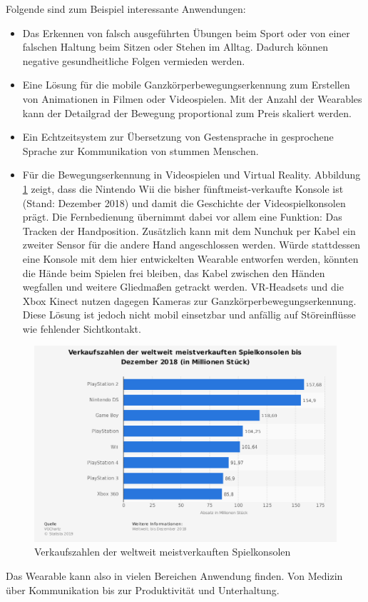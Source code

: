 Folgende sind zum Beispiel interessante Anwendungen:
\begin{itemize}
  \item Das Erkennen von falsch ausgeführten Übungen beim Sport oder von einer falschen Haltung beim Sitzen oder Stehen im Alltag.
	Dadurch können negative gesundheitliche Folgen vermieden werden.
  \item Eine Lösung für die mobile Ganzkörperbewegungserkennung zum Erstellen von Animationen in Filmen oder Videospielen.
	Mit der Anzahl der Wearables kann der Detailgrad der Bewegung proportional zum Preis skaliert werden.
  \item Ein Echtzeitsystem zur Übersetzung von Gestensprache in gesprochene Sprache zur Kommunikation von stummen Menschen.
  \item Für die Bewegungserkennung in Videospielen und Virtual Reality.
	Abbildung \ref{fig:stat_konsolen} zeigt, dass die Nintendo Wii die bisher fünftmeist-verkaufte Konsole ist (Stand: Dezember 2018) und damit die Geschichte der Videospielkonsolen prägt.
	Die Fernbedienung übernimmt dabei vor allem eine Funktion: Das Tracken der Handposition.
	Zusätzlich kann mit dem Nunchuk per Kabel ein zweiter Sensor für die andere Hand angeschlossen werden.
	Würde stattdessen eine Konsole mit dem hier entwickelten Wearable entworfen werden, könnten die Hände beim Spielen frei bleiben, das Kabel zwischen den Händen wegfallen und weitere Gliedmaßen getrackt werden.
	VR-Headsets und die Xbox Kinect nutzen dagegen Kameras zur Ganzkörperbewegungserkennung.
	Diese Lösung ist jedoch nicht mobil einsetzbar und anfällig auf Störeinflüsse wie fehlender Sichtkontakt.
\end{itemize}
\begin{figure}[hbtp]
  \centering
  \includegraphics[width=0.75\linewidth]{res/01_statistic_id160549_weltweit-meistverkaufte-spielkonsolen-bis-dezember-2018.png}
  \caption{Verkaufszahlen der weltweit meistverkauften Spielkonsolen \cite{statistik_konsolen}}
  \label{fig:stat_konsolen}
\end{figure}
Das Wearable kann also in vielen Bereichen Anwendung finden. Von Medizin über Kommunikation bis zur Produktivität und Unterhaltung.

